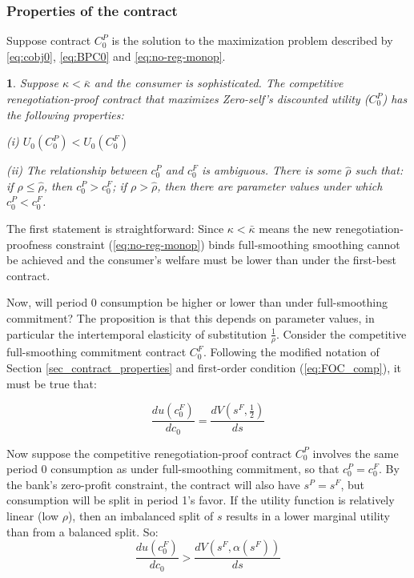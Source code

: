 \documentclass[11pt,english]{article}
\theoremstyle{plain}
\newtheorem{prop}{\protect\propositionname}
\theoremstyle{definition}
\providecommand{\propositionname}{Proposition}
\begin{document}
\subsubsection{Properties of the contract}

Suppose contract $C_{0}^{P}$ is the solution to the maximization
problem described by \ref{eq:cobj0}, \ref{eq:BPC0} and \ref{eq:no-reg-monop}. 
\begin{prop}
Suppose $\kappa<\bar{\kappa}$ and the consumer is sophisticated.
The competitive renegotiation-proof contract that
maximizes Zero-self's discounted utility ($C_{0}^{P}$) has the following
properties:

(i) $U_{0}\left(C_{0}^{P}\right)<U_{0}\left(C_{0}^{F}\right)$

(ii) The relationship between $c_{0}^{P}$ and $c_{0}^{F}$ is ambiguous.
There is some $\hat{\rho}$ such that: if $\rho\leq\hat{\rho}$, then
$c_{0}^{P}>c_{0}^{F}$; if $\rho>\hat{\rho}$, then there are parameter
values under which $c_{0}^{P}<c_{0}^{F}$. 
\end{prop}
The first statement is straightforward: Since $\kappa<\bar{\kappa}$
means the new renegotiation-proofness constraint (\ref{eq:no-reg-monop})
binds full-smoothing smoothing cannot be achieved and the consumer's
welfare must be lower than under the first-best contract.

Now, will period 0 consumption be higher or lower than under full-smoothing
commitment? The proposition is that this depends on parameter values,
in particular the intertemporal elasticity of substitution $\frac{1}{\rho}$.
Consider the competitive full-smoothing commitment contract $C_{0}^{F}$.
Following the modified notation of Section \ref{sec_contract_properties}
and first-order condition (\ref{eq:FOC_comp}), it must be true that:

\begin{equation}
\frac{du\left(c_{0}^{F}\right)}{dc_{0}}=\frac{dV\left(s^{F},\frac{1}{2}\right)}{ds}
\end{equation}

Now suppose the competitive renegotiation-proof contract $C_{0}^{P}$
involves the same period 0 consumption as under full-smoothing commitment,
so that $c_{0}^{P}=c_{0}^{F}$. By the bank's zero-profit constraint,
the contract will also have $s^{P}=s^{F}$, but consumption will be
split in period 1's favor. If the utility function is relatively linear
(low $\rho$), then an imbalanced split of $s$ results in a lower
marginal utility than from a balanced split. So: 
\begin{equation}
\frac{du\left(c_{0}^{F}\right)}{dc_{0}}>\frac{dV\left(s^{F},\alpha\left(s^{F}\right)\right)}{ds}
\end{equation}
\end{document}
